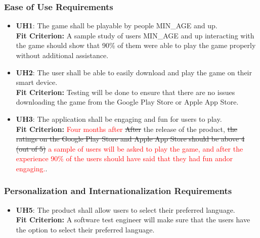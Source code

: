 \documentclass[12pt, titlepage]{article}
\begin{document}
\subsubsection{Ease of Use Requirements}
\begin{itemize}
\item \textbf{UH1}: The game shall be playable by people MIN\_AGE and up.\\
\textbf{Fit Criterion:} A sample study of users MIN\_AGE and up interacting with the game should show that 90\% of them were able to play the game properly without additional assistance.
\item \textbf{UH2}: The user shall be able to easily download and play the game on their smart device.\\
\textbf{Fit Criterion:} Testing will be done to ensure that there are no issues downloading the game from the Google Play Store or Apple App Store.
\item \textbf{UH3}: The application shall be engaging and fun for users to play.\\
\textbf{Fit Criterion:} \textcolor{red}{Four months after} \sout{After} the release of the product, \sout{the ratings on the Google Play Store and Apple App Store should be above 4 (out of 5)} \textcolor{red}{a sample of users will be asked to play the game, and after the experience 90\% of the users should have said that they had fun and\/or engaging.}.
\end{itemize}


\subsubsection{ Personalization and Internationalization Requirements}
\begin{itemize}
    \item \textbf{UH5}: The product shall allow users to select their preferred language.\\
    \textbf{Fit Criterion:} A software test engineer will make sure that the users have the option to select their preferred language.
\end{itemize}
\end{document}
